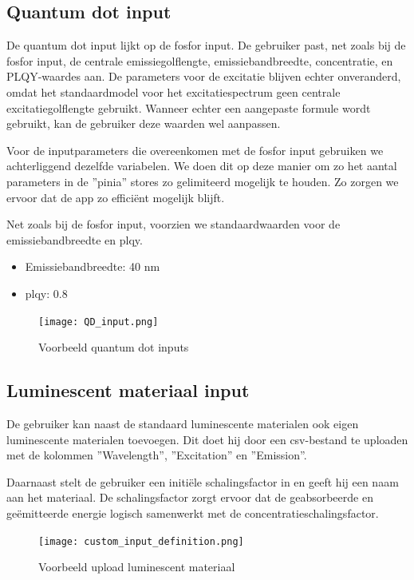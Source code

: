 \subsection{Quantum dot input}

De quantum dot input lijkt op de fosfor input. De gebruiker past, net zoals bij de fosfor input, de centrale emissiegolflengte, emissiebandbreedte, concentratie, en PLQY-waardes aan. De parameters voor de excitatie blijven echter onveranderd, omdat het standaardmodel voor het excitatiespectrum geen centrale excitatiegolflengte gebruikt. Wanneer echter een aangepaste formule wordt gebruikt, kan de gebruiker deze waarden wel aanpassen.

Voor de inputparameters die overeenkomen met de fosfor input gebruiken we achterliggend dezelfde variabelen. We doen dit op deze manier om zo het aantal parameters in de ''pinia'' stores zo gelimiteerd mogelijk te houden. Zo zorgen we ervoor dat de app zo effici\"ent mogelijk blijft.

Net zoals bij de fosfor input, voorzien we standaardwaarden voor de emissiebandbreedte en \gls{plqy}.

\begin{itemize}
    \item Emissiebandbreedte: 40 nm
    \item \gls{plqy}: 0.8
\end{itemize}

\begin{figure}[H]
    \centering
    \texttt{[image: QD\_input.png]}
    \caption{Voorbeeld quantum dot inputs}%
    \label{fig:QD_input}
\end{figure}

\subsection{Luminescent materiaal input}\label{sec:luminescent_input}

De gebruiker kan naast de standaard luminescente materialen ook eigen luminescente materialen toevoegen. Dit doet hij door een \gls{csv}-bestand te uploaden met de kolommen ''Wavelength'', ''Excitation'' en ''Emission''.  

Daarnaast stelt de gebruiker een initi\"ele schalingsfactor in en geeft hij een naam aan het materiaal. De schalingsfactor zorgt ervoor dat de geabsorbeerde en ge\"emitteerde energie logisch samenwerkt met de concentratieschalingsfactor.  


\begin{figure}[H]
    \centering
    \texttt{[image: custom\_input\_definition.png]}
    \caption{Voorbeeld upload luminescent materiaal}%
    \label{fig:luminescent_input_definition}    
\end{figure}

